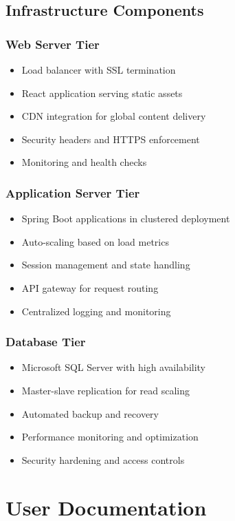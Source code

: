 \documentclass[12pt,a4paper]{article}
\begin{document}
\subsection{Infrastructure Components}

\subsubsection{Web Server Tier}
\begin{itemize}
    \item Load balancer with SSL termination
    \item React application serving static assets
    \item CDN integration for global content delivery
    \item Security headers and HTTPS enforcement
    \item Monitoring and health checks
\end{itemize}

\subsubsection{Application Server Tier}
\begin{itemize}
    \item Spring Boot applications in clustered deployment
    \item Auto-scaling based on load metrics
    \item Session management and state handling
    \item API gateway for request routing
    \item Centralized logging and monitoring
\end{itemize}

\subsubsection{Database Tier}
\begin{itemize}
    \item Microsoft SQL Server with high availability
    \item Master-slave replication for read scaling
    \item Automated backup and recovery
    \item Performance monitoring and optimization
    \item Security hardening and access controls
\end{itemize}

\section{User Documentation}
\end{document}
